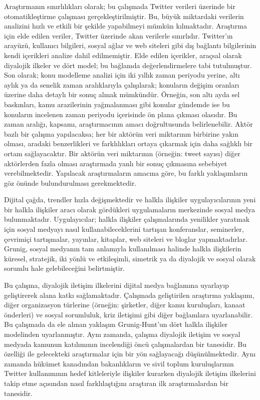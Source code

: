 \documentclass[
]{book}
\begin{document}
Araştırmanın sınırlılıkları olarak; bu çalışmada Twitter verileri üzerinde bir otomatikleştirme çalışması gerçekleştirilmiştir. Bu, büyük miktardaki verilerin analizini hızlı ve etkili bir şekilde yapabilmeyi mümkün kılmaktadır. Araştırma için elde edilen veriler, Twitter üzerinde akan verilerle sınırlıdır. Twitter'ın arayüzü, kullanıcı bilgileri, sosyal ağlar ve web siteleri gibi dış bağlantı bilgilerinin kendi içerikleri analize dahil edilmemiştir. Elde edilen içerikler, araçsal olarak diyalojik ilkeler ve dört model; bu bağlamda değerlendirmelere tabi tutulmuştur. Son olarak; konu modelleme analizi için iki yıllık zaman periyodu yerine, altı aylık ya da senelik zaman aralıklarıyla çalışılarak; konuların değişim oranları üzerine daha detaylı bir sonuç almak mümkündür. Örneğin, son altı ayda sel baskınları, kamu arazilerinin yağmalanması gibi konular gündemde ise bu konuların incelenen zaman periyodu içerisinde ön plana çıkması olasıdır. Bu zaman aralığı, kapsamı, araştırmacının amacı doğrultusunda belirlenebilir. Aktör bazlı bir çalışma yapılacaksa; her bir aktörün veri miktarının birbirine yakın olması, aradaki benzerlikleri ve farklılıkları ortaya çıkarmak için daha sağlıklı bir ortam sağlayacaktır. Bir aktörün veri miktarının (örneğin: tweet sayısı) diğer aktörlerden fazla olması araştırmada yanlı bir sonuç çıkmasına sebebiyet verebilmektedir. Yapılacak araştırmaların amacına göre, bu farklı yaklaşımların göz önünde bulundurulması gerekmektedir.

Dijital çağda, trendler hızla değişmektedir ve halkla ilişkiler uygulayıcılarının yeni bir halkla ilişkiler aracı olarak gördükleri uygulamaların merkezinde sosyal medya bulunmaktadır. Uygulayıcılar; halkla ilişkiler çalışmalarında yenilikler yaratmak için sosyal medyayı nasıl kullanabileceklerini tartışan konferanslar, seminerler, çevrimiçi tartışmalar, yayınlar, kitaplar, web siteleri ve bloglar yapmaktadırlar. Grunig, sosyal medyanın tam anlamıyla kullanılması halinde halkla ilişkilerin küresel, stratejik, iki yönlü ve etkileşimli, simetrik ya da diyalojik ve sosyal olarak sorumlu hale gelebileceğini belirtmiştir. \citep{grunig2009paradigms}

Bu çalışma, diyalojik iletişim ilkelerini \citep{kent2002toward} dijital medya bağlamına uyarlayıp geliştirerek alana katkı sağlamaktadır. Çalışmada geliştirilen araştırma yaklaşımı, diğer organizasyon türlerine (örneğin: şirketler, diğer kamu kuruluşları, kanaat önderleri) ve sosyal sorumluluk, kriz iletişimi gibi diğer bağlamlara uyarlanabilir. Bu çalışmada da ele alınan yaklaşım Grunig-Hunt'un dört halkla ilişkiler modelinden uyarlanmıştır. Aynı zamanda, çalışma diyalojik iletişim ve sosyal medyada kamunun katılımının incelendiği öncü çalışmalardan bir tanesidir. Bu özelliği ile gelecekteki araştırmalar için bir yön sağlayacağı düşünülmektedir. Aynı zamanda hükümet kanadından bakanlıkların ve sivil toplum kuruluşlarının Twitter kullanımının hedef kitleleriyle ilişkiler kurarken diyalojik iletişim ilkelerini takip etme açısından nasıl farklılaştığını araştıran ilk araştırmalardan bir tanesidir.
\end{document}
